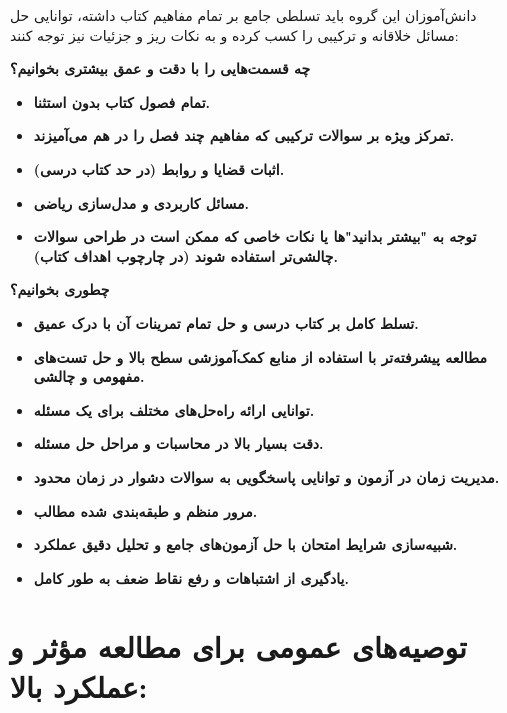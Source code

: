 \documentclass[12pt,a4paper]{article}
\begin{document}
دانش‌آموزان این گروه باید تسلطی جامع بر تمام مفاهیم کتاب داشته، توانایی حل مسائل خلاقانه و ترکیبی را کسب کرده و به نکات ریز و جزئیات نیز توجه کنند:

\textbf{چه قسمت‌هایی را با دقت و عمق بیشتری بخوانیم؟}
\begin{itemize}
    \item \textbf{تمام فصول کتاب بدون استثنا.}
    \item \textbf{تمرکز ویژه بر سوالات ترکیبی که مفاهیم چند فصل را در هم می‌آمیزند.}
    \item \textbf{اثبات قضایا و روابط (در حد کتاب درسی).}
    \item \textbf{مسائل کاربردی و مدل‌سازی ریاضی.}
    \item \textbf{توجه به "بیشتر بدانید"ها یا نکات خاصی که ممکن است در طراحی سوالات چالشی‌تر استفاده شوند (در چارچوب اهداف کتاب).}
\end{itemize}

\textbf{چطوری بخوانیم؟}
\begin{itemize}
    \item \textbf{تسلط کامل بر کتاب درسی و حل تمام تمرینات آن با درک عمیق.}
    \item \textbf{مطالعه پیشرفته‌تر با استفاده از منابع کمک‌آموزشی سطح بالا و حل تست‌های مفهومی و چالشی.}
    \item \textbf{توانایی ارائه راه‌حل‌های مختلف برای یک مسئله.}
    \item \textbf{دقت بسیار بالا در محاسبات و مراحل حل مسئله.}
    \item \textbf{مدیریت زمان در آزمون و توانایی پاسخگویی به سوالات دشوار در زمان محدود.}
    \item \textbf{مرور منظم و طبقه‌بندی شده مطالب.}
    \item \textbf{شبیه‌سازی شرایط امتحان با حل آزمون‌های جامع و تحلیل دقیق عملکرد.}
    \item \textbf{یادگیری از اشتباهات و رفع نقاط ضعف به طور کامل.}
\end{itemize}

\section*{توصیه‌های عمومی برای مطالعه مؤثر و عملکرد بالا:}
\end{document}

